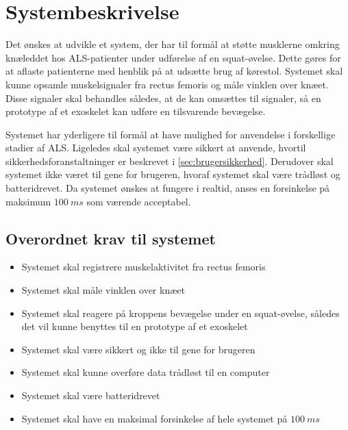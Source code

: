 \section{Systembeskrivelse}
Det ønskes at udvikle et system, der har til formål at støtte musklerne omkring knæleddet hos ALS-patienter under udførelse af en squat-øvelse. 
Dette gøres for at aflaste patienterne med henblik på at udsætte brug af kørestol. 
Systemet skal kunne opsamle muskelsignaler fra rectus femoris og måle vinklen over knæet. 
Disse signaler skal behandles således, at de kan omsættes til signaler, så en prototype af et exoskelet kan udføre en tilsvarende bevægelse. 

Systemet har yderligere til formål at have mulighed for anvendelse i forskellige stadier af ALS. 
Ligeledes skal systemet være sikkert at anvende, hvortil sikkerhedsforanstaltninger er beskrevet i \autoref{sec:brugersikkerhed}. Derudover skal systemet ikke været til gene for brugeren, hvoraf systemet skal være trådløst og batteridrevet. %
Da systemet ønskes at fungere i realtid, anses en forsinkelse på maksimum $100~ms$ som værende acceptabel. 

\subsection{Overordnet krav til systemet}  \label{sec:overordnet_krav}
\begin{itemize}
\item Systemet skal registrere muskelaktivitet fra rectus femoris 
\item Systemet skal måle vinklen over knæet
\item Systemet skal reagere på kroppens bevægelse under en squat-øvelse, således det vil kunne benyttes til en prototype af et exoskelet
\item Systemet skal være sikkert og ikke til gene for brugeren 
\item Systemet skal kunne overføre data trådløst til en computer
\item Systemet skal være batteridrevet
\item Systemet skal have en maksimal forsinkelse af hele systemet på $100~ms$
\end{itemize}


